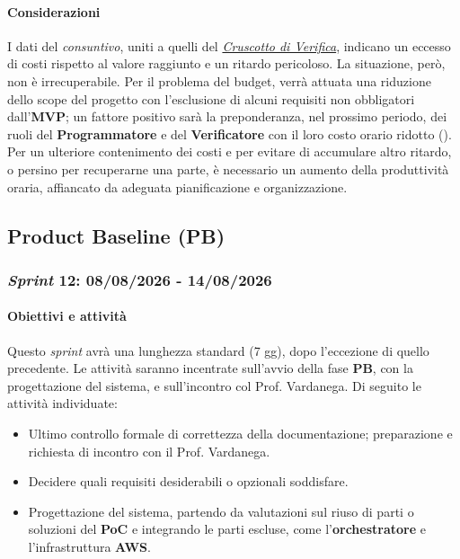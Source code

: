 \documentclass[12pt, a4paper]{article}
\begin{document}
{\paragraph{Considerazioni} I dati del \textit{consuntivo}, uniti a quelli del \href{https://skynetunigroup.github.io/Code_Guardian/Documentazione/RTB/piano_di_qualifica_v1.0.0.pdf}{\textit{Cruscotto di Verifica}}, indicano un eccesso di costi rispetto al valore raggiunto e un ritardo pericoloso. La situazione, però, non è irrecuperabile. Per il problema del budget, verrà attuata una riduzione dello scope del progetto con l'esclusione di alcuni requisiti non obbligatori dall'\textbf{MVP}; un fattore positivo sarà la preponderanza, nel prossimo periodo, dei ruoli del \textbf{Programmatore} e del \textbf{Verificatore} con il loro costo orario ridotto (). Per un ulteriore contenimento dei costi e per evitare di accumulare altro ritardo, o persino per recuperarne una parte, è necessario un aumento della produttività oraria, affiancato da adeguata pianificazione e organizzazione.

\subsection{Product Baseline (\textbf{PB})}

\subsubsection{\textit{Sprint} 12: 08/08/2026 - 14/08/2026}

\paragraph{Obiettivi e attività}

Questo \textit{sprint} avrà una lunghezza standard (7 gg), dopo l'eccezione di quello precedente. Le attività saranno incentrate sull'avvio della fase \textbf{PB}, con la progettazione del sistema, e sull'incontro col Prof. Vardanega. Di seguito le attività individuate:

\begin{itemize}
    \item Ultimo controllo formale di correttezza della documentazione; preparazione e richiesta di incontro con il Prof. Vardanega.
    \item Decidere quali requisiti desiderabili o opzionali soddisfare.
    \item Progettazione del sistema, partendo da valutazioni sul riuso di parti o soluzioni del \textbf{PoC} e integrando le parti escluse, come l'\textbf{orchestratore} e l'infrastruttura \textbf{AWS}.
\end{itemize}

}
\end{document}
